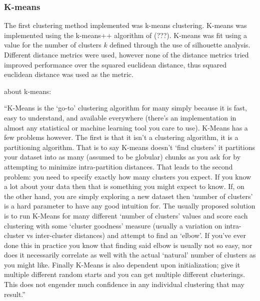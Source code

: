 \documentclass[11pt]{article}
\begin{document}
    \hypertarget{k-means}{%
\subsubsection{K-means}\label{k-means}}



    The first clustering method implemented was k-means clustering. K-means
was implemented using the k-means++ algorithm of (???). K-means was fit
using a value for the number of clusters \(k\) defined through the use
of silhouette analysis. Different distance metrics were used, however
none of the distance metrics tried improved performance over the squared
euclidean distance, thus squared euclidean distance was used as the
metric.

about k-means:

``K-Means is the `go-to' clustering algorithm for many simply because it
is fast, easy to understand, and available everywhere (there's an
implementation in almost any statistical or machine learning tool you
care to use). K-Means has a few problems however. The first is that it
isn't a clustering algorithm, it is a partitioning algorithm. That is to
say K-means doesn't `find clusters' it partitions your dataset into as
many (assumed to be globular) chunks as you ask for by attempting to
minimize intra-partition distances. That leads to the second problem:
you need to specify exactly how many clusters you expect. If you know a
lot about your data then that is something you might expect to know. If,
on the other hand, you are simply exploring a new dataset then `number
of clusters' is a hard parameter to have any good intuition for. The
usually proposed solution is to run K-Means for many different `number
of clusters' values and score each clustering with some `cluster
goodness' measure (usually a variation on intra-cluster vs inter-cluster
distances) and attempt to find an `elbow'. If you've ever done this in
practice you know that finding said elbow is usually not so easy, nor
does it necessarily correlate as well with the actual `natural' number
of clusters as you might like. Finally K-Means is also dependent upon
initialization; give it multiple different random starts and you can get
multiple different clusterings. This does not engender much confidence
in any individual clustering that may result.''
\end{document}
